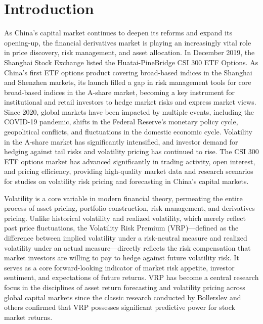 \documentclass[a4paper, 12pt]{article}    %
\begin{document}
\section{Introduction}

As China’s capital market continues to deepen its reforms and expand its opening-up, the financial derivatives market is playing an increasingly vital role in price discovery, risk management, and asset allocation. In December 2019, the Shanghai Stock Exchange listed the Huatai-PineBridge CSI 300 ETF Options. As China’s first ETF options product covering broad-based indices in the Shanghai and Shenzhen markets, its launch filled a gap in risk management tools for core broad-based indices in the A-share market, becoming a key instrument for institutional and retail investors to hedge market risks and express market views. Since 2020, global markets have been impacted by multiple events, including the COVID-19 pandemic, shifts in the Federal Reserve’s monetary policy cycle, geopolitical conflicts, and fluctuations in the domestic economic cycle. Volatility in the A-share market has significantly intensified, and investor demand for hedging against tail risks and volatility pricing has continued to rise. The CSI 300 ETF options market has advanced significantly in trading activity, open interest, and pricing efficiency, providing high-quality market data and research scenarios for studies on volatility risk pricing and forecasting in China’s capital markets.

Volatility is a core variable in modern financial theory, permeating the entire process of asset pricing, portfolio construction, risk management, and derivatives pricing. Unlike historical volatility and realized volatility, which merely reflect past price fluctuations, the Volatility Risk Premium (VRP)—defined as the difference between implied volatility under a risk-neutral measure and realized volatility under an actual measure—directly reflects the risk compensation that market investors are willing to pay to hedge against future volatility risk. It serves as a core forward-looking indicator of market risk appetite, investor sentiment, and expectations of future returns. VRP has become a central research focus in the disciplines of asset return forecasting and volatility pricing across global capital markets since the classic research conducted by Bollerslev and others confirmed that VRP possesses significant predictive power for stock market returns.
\end{document}

